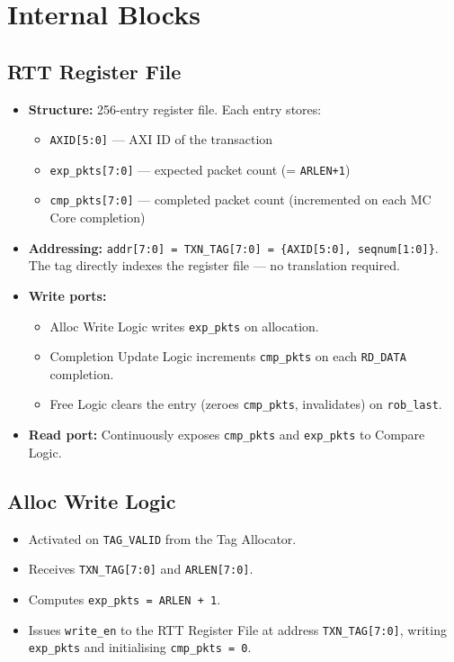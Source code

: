 \documentclass[11pt,a4paper]{article}
\begin{document}
\section{Internal Blocks}

\subsection{RTT Register File}

\begin{itemize}
  \item \textbf{Structure:} 256-entry register file. Each entry stores:
  \begin{itemize}
    \item \texttt{AXID[5:0]} — AXI ID of the transaction
    \item \texttt{exp\_pkts[7:0]} — expected packet count (= \texttt{ARLEN+1})
    \item \texttt{cmp\_pkts[7:0]} — completed packet count (incremented on each MC Core completion)
  \end{itemize}
  \item \textbf{Addressing:} \texttt{addr[7:0] = TXN\_TAG[7:0] = \{AXID[5:0], seqnum[1:0]\}}.
        The tag directly indexes the register file — no translation required.
  \item \textbf{Write ports:}
  \begin{itemize}
    \item Alloc Write Logic writes \texttt{exp\_pkts} on allocation.
    \item Completion Update Logic increments \texttt{cmp\_pkts} on each
          \texttt{RD\_DATA} completion.
    \item Free Logic clears the entry (zeroes \texttt{cmp\_pkts}, invalidates)
          on \texttt{rob\_last}.
  \end{itemize}
  \item \textbf{Read port:} Continuously exposes \texttt{cmp\_pkts} and
        \texttt{exp\_pkts} to Compare Logic.
\end{itemize}

\subsection{Alloc Write Logic}

\begin{itemize}
  \item Activated on \texttt{TAG\_VALID} from the Tag Allocator.
  \item Receives \texttt{TXN\_TAG[7:0]} and \texttt{ARLEN[7:0]}.
  \item Computes \texttt{exp\_pkts = ARLEN + 1}.
  \item Issues \texttt{write\_en} to the RTT Register File at address
        \texttt{TXN\_TAG[7:0]}, writing \texttt{exp\_pkts} and
        initialising \texttt{cmp\_pkts = 0}.
\end{itemize}
\end{document}
